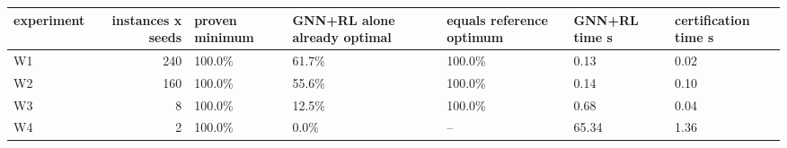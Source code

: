 \begin{tabular}{lrlllll}
\toprule
experiment & instances x seeds & proven minimum & GNN+RL alone already optimal & equals reference optimum & GNN+RL time s & certification time s \\
\midrule
W1 & 240 & 100.0\% & 61.7\% & 100.0\% & 0.13 & 0.02 \\
W2 & 160 & 100.0\% & 55.6\% & 100.0\% & 0.14 & 0.10 \\
W3 & 8 & 100.0\% & 12.5\% & 100.0\% & 0.68 & 0.04 \\
W4 & 2 & 100.0\% & 0.0\% & -- & 65.34 & 1.36 \\
\bottomrule
\end{tabular}
